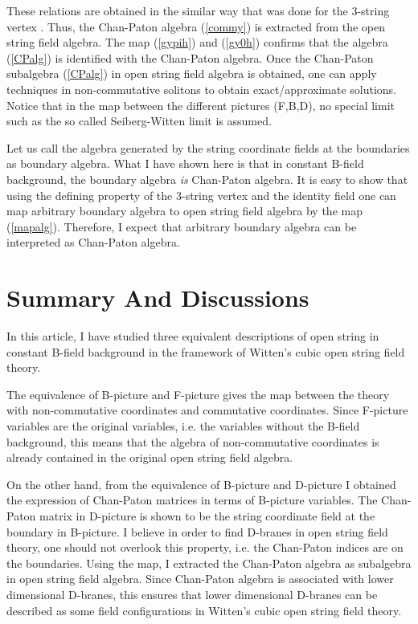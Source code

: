 \documentclass[a4paper,12pt]{article}
\def\bra{\langle}
\begin{document}
These relations are obtained in the similar way
that was done for the 3-string vertex \myHighlight{$\bra V_3|$}\coordHE{}.
Thus, the Chan-Paton algebra
(\ref{commy})
is extracted from the open string field algebra.
The map
(\ref{gypih}) and (\ref{gy0h})
confirms that
the algebra (\ref{CPalg})
is identified with the Chan-Paton algebra.
Once the Chan-Paton subalgebra
(\ref{CPalg}) in open string field algebra is
obtained, one can
apply techniques in non-commutative solitons
to obtain exact/approximate solutions.
Notice that in the map
between the different pictures (F,B,D),
no special limit such as 
the so called Seiberg-Witten limit \cite{NCSW}
is assumed.










Let us call the algebra
generated by the string coordinate fields
at the boundaries
as boundary algebra.
What I have shown here is 
that in constant
B-field background,
the boundary algebra {\em is} 
Chan-Paton algebra.
It is easy to show that
using the defining  property of
the 3-string vertex and the identity
field
one can map arbitrary boundary algebra
to open string field algebra
by the map (\ref{mapalg}).
Therefore, 
I expect that
arbitrary boundary algebra
can be interpreted as
Chan-Paton algebra.





\section{Summary And Discussions}\label{summary}
In this article, I have studied
three equivalent
descriptions of open string in constant B-field 
background
in the framework of
Witten's cubic open string field theory.

The equivalence
of B-picture and F-picture
gives the map between the theory with
non-commutative coordinates and
commutative coordinates.
Since F-picture variables
are the original variables, i.e.
the variables without the B-field background,
this means
that the algebra of non-commutative coordinates
is already contained in the
original open string field algebra.


On the other hand,
from the equivalence of
B-picture and D-picture
I obtained the expression of
Chan-Paton matrices
in terms of B-picture variables.
The Chan-Paton matrix in D-picture is
shown to be the string coordinate field
at the boundary in B-picture.
I believe  
in order to find D-branes in open string field theory,
one should not overlook this property, i.e.
the Chan-Paton indices are on the boundaries.
Using the map,
I extracted
the Chan-Paton algebra
as subalgebra in
open string field algebra. 
Since Chan-Paton algebra is
associated with 
lower dimensional D-branes,
this ensures that lower dimensional 
D-branes can be described
as some
field configurations
in Witten's cubic open string field theory.
\end{document}
